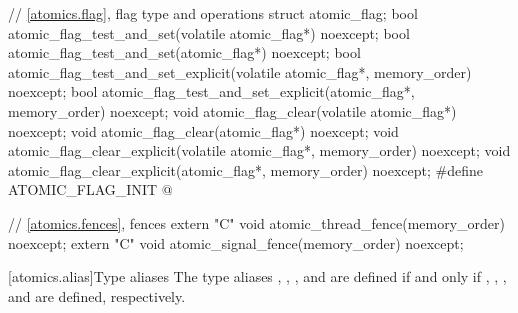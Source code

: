 \begin{codeblock}
{  // \ref{atomics.flag}, flag type and operations
  struct atomic_flag;
  bool atomic_flag_test_and_set(volatile atomic_flag*) noexcept;
  bool atomic_flag_test_and_set(atomic_flag*) noexcept;
  bool atomic_flag_test_and_set_explicit(volatile atomic_flag*, memory_order) noexcept;
  bool atomic_flag_test_and_set_explicit(atomic_flag*, memory_order) noexcept;
  void atomic_flag_clear(volatile atomic_flag*) noexcept;
  void atomic_flag_clear(atomic_flag*) noexcept;
  void atomic_flag_clear_explicit(volatile atomic_flag*, memory_order) noexcept;
  void atomic_flag_clear_explicit(atomic_flag*, memory_order) noexcept;
  #define ATOMIC_FLAG_INIT @\seebelow@

  // \ref{atomics.fences}, fences
  extern "C" void atomic_thread_fence(memory_order) noexcept;
  extern "C" void atomic_signal_fence(memory_order) noexcept;
}
\end{codeblock}

[atomics.alias]{Type aliases}
%
%
%
%
%
%
%
%
%
%
%
%
%
%
%
%
%
%
%
%
%
%
%
%
%
%
%
%
%
%
%
%
%
%
%
%
%
%
%
%
%
%
%
%
%
\pnum
The type aliases , ,
, and 
are defined if and only if
, ,
, and 
are defined, respectively.

